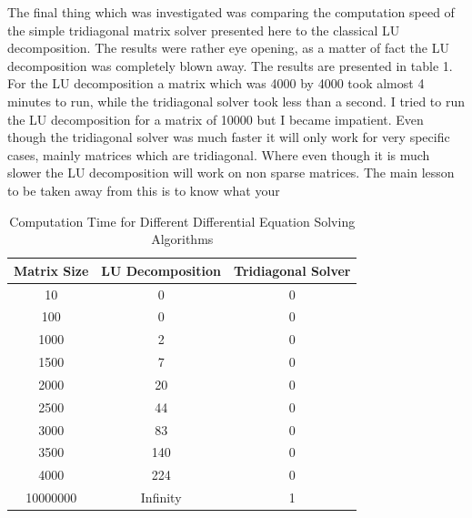 \documentclass[12pt,righttag]{article}
\begin{document}
	The final thing which was investigated was comparing the computation speed of the simple tridiagonal matrix solver presented here to the classical LU decomposition. The results were rather eye opening, as a matter of fact the LU decomposition was completely blown away. The results are presented in table 1. For the LU decomposition a matrix which was 4000 by 4000 took almost 4 minutes to run, while the tridiagonal solver took less than a second. I tried to run the LU decomposition for a matrix of 10000 but I became impatient. Even though the tridiagonal solver was much faster it will only work for very specific cases, mainly matrices which are tridiagonal. Where even though it is much slower the LU decomposition will work on non sparse matrices. The main lesson to be taken away from this is to know what your
	\begin{table}
		\caption{Computation Time for Different Differential Equation Solving Algorithms}
		\begin{tabular}{c c c}
			\hline\hline
			Matrix Size & LU Decomposition & Tridiagonal Solver \\ 
			\hline
			10 & 0 & 0 \\
			100 & 0 & 0 \\
			1000 & 2 & 0 \\
			1500 & 7 & 0 \\
			2000 & 20 & 0 \\
			2500 & 44 & 0 \\
			3000 & 83 & 0 \\
			3500 & 140 & 0 \\
			4000 & 224 & 0 \\
			10000000 & Infinity & 1 \\
			\hline
			\end{tabular}
	\end{table}
	
\end{document}
